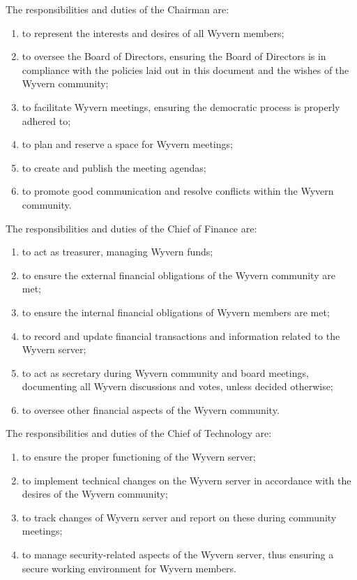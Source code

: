 \begin{enumerate}
    \begin{item}
        The responsibilities and duties of the Chairman are:
        \begin{enumerate}
            \item to represent the interests and desires of all Wyvern members;
            \item to oversee the Board of Directors, ensuring the Board of Directors is in compliance with the policies laid out in this document and the wishes of the Wyvern community;
            \item to facilitate Wyvern meetings, ensuring the democratic process is properly adhered to;
            \item to plan and reserve a space for Wyvern meetings;
            \item to create and publish the meeting agendas;
            \item to promote good communication and resolve conflicts within the Wyvern community.
        \end{enumerate}
    \end{item}

    \begin{item}
        The responsibilities and duties of the Chief of Finance are:
        \begin{enumerate}
            \item to act as treasurer, managing Wyvern funds;
            \item to ensure the external financial obligations of the Wyvern community are met;
            \item to ensure the internal financial obligations of Wyvern members are met;
            \item to record and update financial transactions and information related to the Wyvern server;
            \item to act as secretary during Wyvern community and board meetings, documenting all Wyvern discussions and votes, unless decided otherwise;
            \item to oversee other financial aspects of the Wyvern community.
        \end{enumerate}
    \end{item}

    \begin{item}
        The responsibilities and duties of the Chief of Technology are:
        \begin{enumerate}
            \item to ensure the proper functioning of the Wyvern server;
            \item to implement technical changes on the Wyvern server in accordance with the desires of the Wyvern community;
            \item to track changes of Wyvern server and report on these during community meetings;
            \item to manage security-related aspects of the Wyvern server, thus ensuring a secure working environment for Wyvern members.
        \end{enumerate}
    \end{item}


\end{enumerate}

